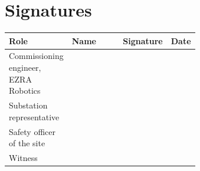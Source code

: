 \section{Signatures}

\begin{center}
\renewcommand{\arraystretch}{2.6}
\begin{tabularx}{\linewidth}{@{}p{0.3\linewidth}Xp{0.2\linewidth}p{0.14\linewidth}@{}}
  \toprule
  \textbf{Role} & \textbf{Name} & \textbf{Signature} & \textbf{Date} \\
  \midrule
  Commissioning engineer, EZRA Robotics & & & \\
  Substation representative & & & \\
  Safety officer of the site & & & \\
  Witness & & & \\
  \bottomrule
\end{tabularx}
\end{center}

